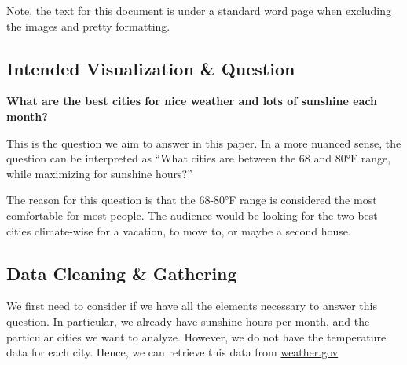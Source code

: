 \documentclass{article}
\begin{document}
\newpage
Note, the text for this document is under a standard word page when excluding the images and pretty formatting. 

\subsection{Intended Visualization \& Question}

\textbf{What are the best cities for nice weather and lots of sunshine each month?}

This is the question we aim to answer in this paper. In a more nuanced sense,
the question can be interpreted as \textquotedblleft What cities are between the 68 and 80°F
range, while maximizing for sunshine hours?\textquotedblright

The reason for this question is that the 68-80°F range is considered the most comfortable for most people. 
The audience would be looking for the two best cities climate-wise for a vacation, to move to, or maybe a second house.

\subsection{Data Cleaning \& Gathering}

We first need to consider if we have all the elements necessary to answer this question.
In particular, we already have sunshine hours per month, and the particular cities we want to analyze.
However, we do not have the temperature data for each city. Hence, we can retrieve this data from \href{https://www.weather.gov/wrh/Climate}{weather.gov} 
\end{document}
